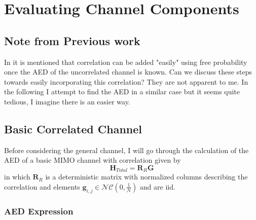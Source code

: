 \documentclass[12pt,a4paper]{report}
\begin{document}

\section{Evaluating Channel Components}
\subsection{Note from Previous work}\label{ssection:basic_correlation}
In \cite[Section II Eqn. 4]{muller2012channel} it is mentioned that correlation can be added "easily" using free probability once the AED of the uncorrelated channel is known. Can we discuss these steps towards easily incorporating this correlation? They are not apparent to me. In the following I attempt to find the AED in a similar case but it seems quite tedious, I imagine there is an easier way. 

\subsection{Basic Correlated Channel}\label{ssection:basic_correlation}
	Before considering the general channel,  I will go through the calculation of the AED of a basic MIMO 
	channel with correlation given by
	\begin{equation}
	\mathbf{H}_{Total} = \mathbf{R}_{R}\mathbf{G}
	\end{equation}
	in which $\mathbf{R}_{R}$ is a deterministic matrix with normalized columns describing the correlation and
	elements $\mathbf{g}_{i,j} \in \mathcal{NC}(0,\frac{1}{N})$ and are iid.
	

\subsubsection{AED Expression}
	
\end{document}

